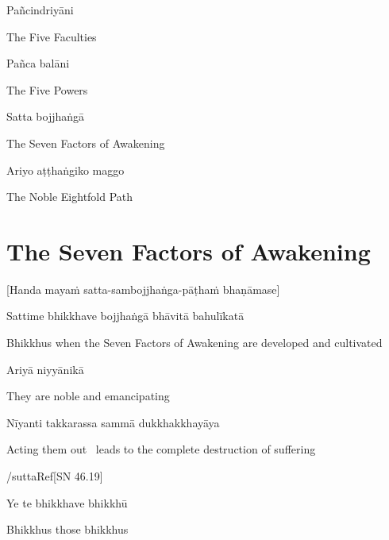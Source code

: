 Pañcindriyāni

\begin{cprenglish}
  The Five Faculties
\end{cprenglish}

Pañca balāni

\begin{cprenglish}
  The Five Powers
\end{cprenglish}

Satta bojjhaṅgā

\begin{cprenglish}
  The Seven Factors of Awakening
\end{cprenglish}

Ariyo aṭṭhaṅgiko maggo

\begin{cprenglish}
  The Noble Eightfold Path
\end{cprenglish}

\suttaRef{[DN 16]}

\clearpage

\section{The Seven Factors of Awakening}
\label{seven-awakening-factors}

\begin{center}
  [Handa mayaṁ satta-sambojjhaṅga-pāṭhaṁ bhaṇāmase]
\end{center}

Sattime bhikkhave bojjhaṅgā bhāvitā bahulīkatā

\begin{cprenglish}
  Bhikkhus when the Seven Factors of Awakening are developed and cultivated
\end{cprenglish}

Ariyā niyyānikā

\begin{cprenglish}
  They are noble and emancipating
\end{cprenglish}

Nīyanti takkarassa sammā dukkhakkhayāya

\begin{cprenglish}
  Acting them out \breathmark\ leads to the complete destruction of suffering
\end{cprenglish}

/suttaRef{[SN 46.19]}

Ye te bhikkhave bhikkhū

\begin{cprenglish}
  Bhikkhus those bhikkhus
\end{cprenglish}

